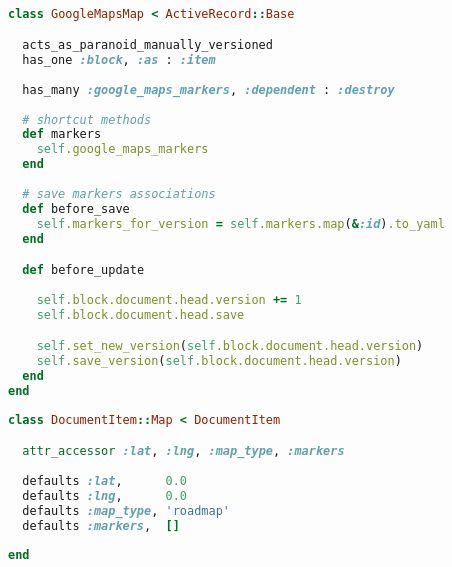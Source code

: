 \begin{lstlisting}[language=ruby, float=htb, label=src:block_before, caption=Original ``Map'' Block item.]

class GoogleMapsMap < ActiveRecord::Base

  acts_as_paranoid_manually_versioned
  has_one :block, :as : :item
  
  has_many :google_maps_markers, :dependent : :destroy
  
  # shortcut methods
  def markers
    self.google_maps_markers
  end
  
  # save markers associations
  def before_save
    self.markers_for_version = self.markers.map(&:id).to_yaml
  end

  def before_update
  
    self.block.document.head.version += 1
    self.block.document.head.save

    self.set_new_version(self.block.document.head.version)
    self.save_version(self.block.document.head.version)
  end
end
\end{lstlisting}

\begin{lstlisting}[language=ruby, float=htb, label=src:block_after, caption=Refactored ``Map'' Block item.]
class DocumentItem::Map < DocumentItem

  attr_accessor :lat, :lng, :map_type, :markers
  
  defaults :lat,      0.0
  defaults :lng,      0.0
  defaults :map_type, 'roadmap'
  defaults :markers,  []
  
end
\end{lstlisting}
